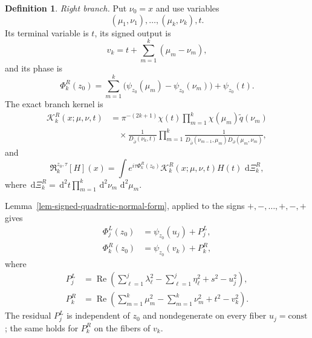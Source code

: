 \documentclass[a4paper,11pt]{article}
\newcommand{\dd}{\,\text{d}}
\theoremstyle{plain}
\theoremstyle{definition}
\newtheorem{dfn}[thm]{Definition}
\theoremstyle{remark}
\begin{document}
\begin{dfn}
\par\smallskip\noindent\textit{Right branch.}
Put $\nu_0=x$ and use variables
\[
 (\mu_1,\nu_1),\ldots,(\mu_k,\nu_k),t .
\]
Its terminal variable is $t$, its signed output is
\begin{equation}\label{exact-right-output}
        v_k=t+\sum_{m=1}^k(\mu_m-\nu_m),
\end{equation}
and its phase is
\begin{equation}\label{exact-right-phase}
        \Phi_k^R(z_0)
        =\sum_{m=1}^k
          \bigl(\psi_{z_0}(\mu_m)-\psi_{z_0}(\nu_m)\bigr)
          +\psi_{z_0}(t).
\end{equation}
The exact branch kernel is
\begin{equation}\label{exact-right-kernel}
\begin{aligned}
\mathcal K_k^R(x;\mu,\nu,t)
&=\pi^{-(2k+1)}\chi(t)
  \prod_{m=1}^k\chi(\mu_m)\widetilde q(\nu_m)\\
&\quad\times
  \frac{1}{D_{\bar\partial}(\nu_k,t)}
  \prod_{m=1}^k
  \frac{1}{D_{\bar\partial}(\nu_{m-1},\mu_m)
          D_\partial(\mu_m,\nu_m)} ,
\end{aligned}
\end{equation}
and
\begin{equation}\label{exact-right-expanded}
\mathfrak R_k^{z_0,\tau}[H](x)
 =\int e^{i\tau\Phi_k^R(z_0)}
       \mathcal K_k^R(x;\mu,\nu,t)H(t)\,\dd\Xi_k^R,
\end{equation}
where $\dd\Xi_k^R=\dd^2t\prod_{m=1}^k\dd^2\nu_m\,\dd^2\mu_m$.
\end{dfn}

Lemma~\ref{lem-signed-quadratic-normal-form}, applied to
the signs $+,-,\ldots,+,-,+$ gives
\begin{align}
        \Phi_j^L(z_0)
        &=\psi_{z_0}(u_j)+P_j^L,
        \label{exact-left-phase-split}\\
        \Phi_k^R(z_0)
        &=\psi_{z_0}(v_k)+P_k^R,
        \label{exact-right-phase-split}
\end{align}
where
\begin{align}
P_j^L
&=\operatorname{Re}\left(
  \sum_{\ell=1}^j\lambda_\ell^2
 -\sum_{\ell=1}^j\eta_\ell^2+s^2-u_j^2\right),
\label{exact-left-residual-phase}\\
P_k^R
&=\operatorname{Re}\left(
  \sum_{m=1}^k\mu_m^2
 -\sum_{m=1}^k\nu_m^2+t^2-v_k^2\right).
\label{exact-right-residual-phase}
\end{align}
The residual $P_j^L$ is independent of $z_0$ and nondegenerate on every fiber
$u_j=\mathrm{const}$; the same holds for $P_k^R$ on the fibers of $v_k$.
\end{document}
